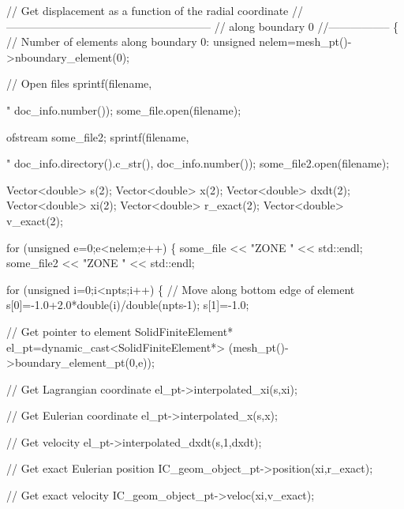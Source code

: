 \begin{DoxyCodeInclude}


 \textcolor{comment}{// Get displacement as a function of the radial coordinate}
 \textcolor{comment}{//--------------------------------------------------------}
 \textcolor{comment}{// along boundary 0}
 \textcolor{comment}{//-----------------}
 \{
  \textcolor{comment}{// Number of elements along boundary 0:}
  \textcolor{keywordtype}{unsigned} nelem=mesh\_pt()->nboundary\_element(0);

  \textcolor{comment}{// Open files}
  sprintf(filename,\textcolor{stringliteral}{"%
          doc\_info.number());
  some\_file.open(filename);

  ofstream some\_file2;
  sprintf(filename,\textcolor{stringliteral}{"%
          doc\_info.directory().c\_str(),
          doc\_info.number());
  some\_file2.open(filename);
  
  Vector<double> s(2);
  Vector<double> x(2);
  Vector<double> dxdt(2);
  Vector<double> xi(2);
  Vector<double> r\_exact(2);
  Vector<double> v\_exact(2);

  \textcolor{keywordflow}{for} (\textcolor{keywordtype}{unsigned} e=0;e<nelem;e++)
   \{
    some\_file << \textcolor{stringliteral}{"ZONE "} << std::endl;
    some\_file2 << \textcolor{stringliteral}{"ZONE "} << std::endl;

    \textcolor{keywordflow}{for} (\textcolor{keywordtype}{unsigned} i=0;i<npts;i++)
     \{
      \textcolor{comment}{// Move along bottom edge of element}
      s[0]=-1.0+2.0*double(i)/double(npts-1);
      s[1]=-1.0;

      \textcolor{comment}{// Get pointer to element}
      SolidFiniteElement* el\_pt=\textcolor{keyword}{dynamic\_cast<}SolidFiniteElement*\textcolor{keyword}{>}
       (mesh\_pt()->boundary\_element\_pt(0,e));
      
      \textcolor{comment}{// Get Lagrangian coordinate}
      el\_pt->interpolated\_xi(s,xi);

      \textcolor{comment}{// Get Eulerian coordinate}
      el\_pt->interpolated\_x(s,x);

      \textcolor{comment}{// Get velocity }
      el\_pt->interpolated\_dxdt(s,1,dxdt);

      \textcolor{comment}{// Get exact Eulerian position}
      IC\_geom\_object\_pt->position(xi,r\_exact);

      \textcolor{comment}{// Get exact velocity}
      IC\_geom\_object\_pt->veloc(xi,v\_exact);
  
}}
\end{DoxyCodeInclude}
